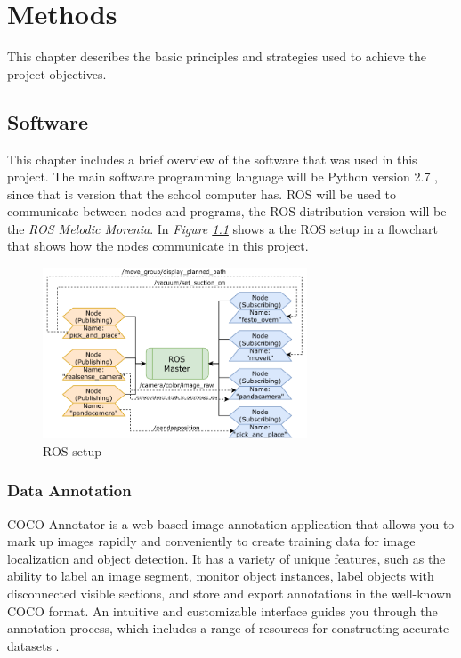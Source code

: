\chapter{Methods}
This chapter describes the basic principles and strategies used to achieve the project objectives. 
\section{Software}

This chapter includes a brief overview of the software that was used in this project. The main software programming language will be Python version 2.7 \cite{noauthor_python_nodate}, since that is version that the school computer has. ROS will be used to communicate between nodes and programs, the ROS distribution version will be the \textit{ROS Melodic Morenia}\cite{noauthor_melodic_nodate}. In \textit{Figure \ref{fig:roswork}} shows a the ROS setup in a flowchart that shows how the nodes communicate in this project.
\begin{figure}[h]
    \centering
    \includegraphics[width=0.7\textwidth]{graphics/ros.pdf}
    \caption{ROS setup}
    \label{fig:roswork}
\end{figure}


\subsection{Data Annotation}
COCO Annotator is a web-based image annotation application that allows you to mark up images rapidly and conveniently to create training data for image localization and object detection. It has a variety of unique features, such as the ability to label an image segment, monitor object instances, label objects with disconnected visible sections, and store and export annotations in the well-known COCO format. An intuitive and customizable interface guides you through the annotation process, which includes a range of resources for constructing accurate datasets \cite{brooks_jsbrokscoco-annotator_2021}.

